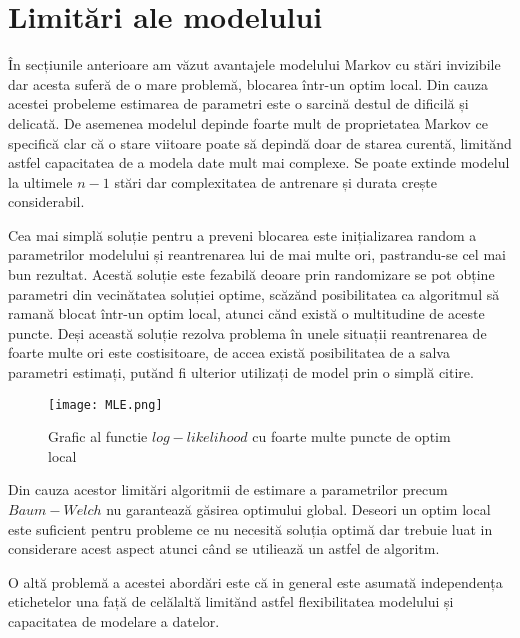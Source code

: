 \section{Limitări ale modelului}

În secțiunile anterioare am văzut avantajele modelului Markov cu stări invizibile dar acesta suferă de o mare problemă, blocarea într-un optim local. Din cauza acestei probeleme estimarea de parametri este o sarcină destul de dificilă și delicată. De asemenea modelul depinde foarte mult de proprietatea Markov ce specifică clar că o stare viitoare poate să depindă doar de starea curentă, limitănd astfel capacitatea de a modela date mult mai complexe. Se poate extinde modelul la ultimele $n-1$ stări dar complexitatea de antrenare și durata crește considerabil.
\par

Cea mai simplă soluție pentru a preveni blocarea este inițializarea random a parametrilor modelului și reantrenarea lui de mai multe ori, pastrandu-se cel mai bun rezultat. Acestă soluție este fezabilă deoare prin randomizare se pot obține parametri din vecinătatea soluției optime, scăzănd posibilitatea ca algoritmul să ramană blocat într-un optim local, atunci cănd există o multitudine de aceste puncte. Deși această soluție rezolva problema în unele situații reantrenarea de foarte multe ori este costisitoare, de accea există posibilitatea de a salva parametri estimați, putănd fi ulterior utilizați de model prin o simplă citire.\par

\vspace{10mm}
\begin{figure}[H]
\centering
\texttt{[image: MLE.png]} \par
\caption{Grafic al functie $log-likelihood$ cu foarte multe puncte de optim local}
\end{figure}

Din cauza acestor limitări algoritmii de estimare a parametrilor precum $Baum-Welch$ nu garantează găsirea optimului global. Deseori un optim local este suficient pentru probleme ce nu necesită soluția optimă dar trebuie luat in considerare acest aspect atunci când se utiliează un astfel de algoritm.\par

O altă problemă a acestei abordări este că in general este asumată independența etichetelor una față de celălaltă limitănd astfel flexibilitatea modelului și capacitatea de modelare a datelor.\par

